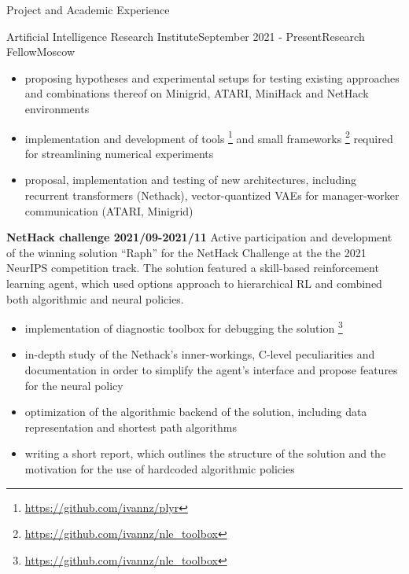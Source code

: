 \documentclass{resume} %
\begin{document}
\begin{rSection}{Project and Academic Experience}
\begin{rSubsection}{Artificial Intelligence Research Institute}{September 2021 - Present}{Research Fellow}{Moscow}
\begin{itemize}
        \item proposing hypotheses and experimental setups for testing existing approaches
        and combinations thereof on Minigrid, ATARI, MiniHack and NetHack environments
        
        \item implementation and development of tools%
            \footnote{\url{https://github.com/ivannz/plyr}}
        and small frameworks%
            \footnote{\url{https://github.com/ivannz/nle_toolbox}}
        required for streamlining numerical experiments
        
        \item proposal, implementation and testing of new architectures, including
        recurrent transformers (Nethack), vector-quantized VAEs for manager-worker
        communication (ATARI, Minigrid)
    \end{itemize}

    \medskip
    \item \textbf{NetHack challenge 2021/09-2021/11}
    Active participation and development of the winning solution ``Raph'' for the NetHack
    Challenge at the the 2021 NeurIPS competition track. The solution featured a skill-based
    reinforcement learning agent, which used options approach to hierarchical RL and combined
    both algorithmic and neural policies.
    \begin{itemize}
        \item implementation of diagnostic toolbox for debugging the solution%
            \footnote{\url{https://github.com/ivannz/nle_toolbox}}
        
        \item in-depth study of the Nethack's inner-workings, C-level peculiarities and
        documentation in order to simplify the agent's interface and propose features for
        the neural policy
        
        \item optimization of the algorithmic backend of the solution, including data representation
        and shortest path algorithms
        
        \item writing a short report, which outlines the structure of the solution and
        the motivation for the use of hardcoded algorithmic policies
    \end{itemize}
\end{rSubsection}


\end{rSection}
\end{document}
